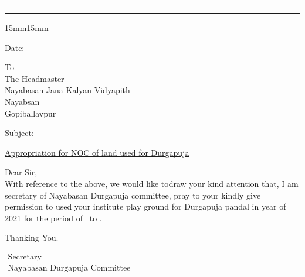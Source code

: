 

\begin{center}
\myheader
\end{center}
\hrule \vspace*{2pt} \hrule  \vspace*{20pt}
\begin{adjustwidth}{15mm}{15mm}\large 
	\begin{flushright} 
		Date: \underline{\datecontainer}
	\end{flushright}\large\vspace{1cm}
	
	\noindent To\\
	  The Headmaster\\
	 Nayabasan Jana Kalyan Vidyapith\\
  Nayabsan\\
	  Gopiballavpur 
	 \vspace{1cm}
	 
	\noindent\begin{minipage}{.1\textwidth} Subject:
		\end{minipage}\begin{minipage}{.8\textwidth} 
		\underline{Appropriation for NOC of land used for Durgapuja \thisyear }
	\end{minipage}
\vspace{1cm}

\noindent Dear Sir,\\
\hspace*{1.5cm} 
With reference to the above, we would like todraw your kind attention that, I am secretary of Nayabasan Durgapuja committee, pray to your kindly give permission to used your institute play ground for Durgapuja pandal in year of 2021 for the period of \SchoolPermissionFrom\  to \SchoolPermissionTo. 

Thanking You. 
	\vspace{7ex}
	\begin{flushright}
		$\begin{array}{c}\mbox{Secretary}\\\mbox{Nayabasan Durgapuja Committee}\end{array}$
	\end{flushright}
\end{adjustwidth}
